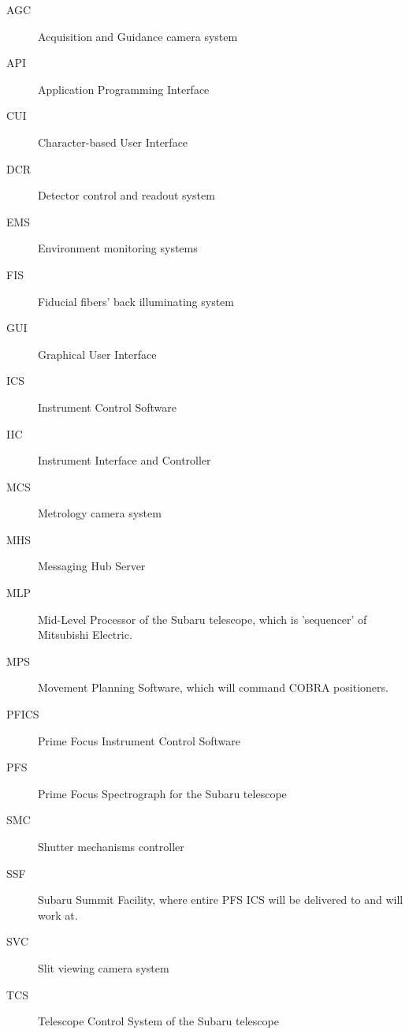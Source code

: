\documentclass[a4paper,notitlepage]{article}
\begin{document}
\begin{description}
  \item[AGC] Acquisition and Guidance camera system
  \item[API] Application Programming Interface
  \item[CUI] Character-based User Interface
  \item[DCR] Detector control and readout system
  \item[EMS] Environment monitoring systems
  \item[FIS] Fiducial fibers' back illuminating system
  \item[GUI] Graphical User Interface
  \item[ICS] Instrument Control Software
  \item[IIC] Instrument Interface and Controller
  \item[MCS] Metrology camera system
  \item[MHS] Messaging Hub Server
  \item[MLP] Mid-Level Processor of the Subaru telescope, which is 'sequencer' 
    of Mitsubishi Electric.
  \item[MPS] Movement Planning Software, which will command COBRA positioners.
  \item[PFICS] Prime Focus Instrument Control Software
  \item[PFS] Prime Focus Spectrograph for the Subaru telescope
  \item[SMC] Shutter mechanisms controller
  \item[SSF] Subaru Summit Facility, where entire PFS ICS will be delivered 
    to and will work at.
  \item[SVC] Slit viewing camera system
  \item[TCS] Telescope Control System of the Subaru telescope
\end{description}
\end{document}
